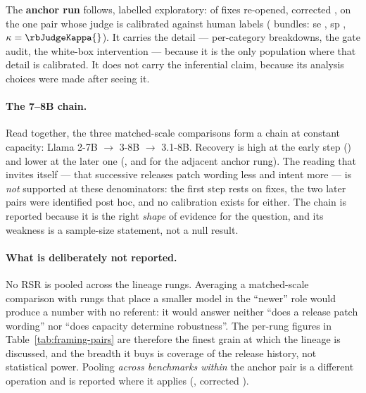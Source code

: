 The \textbf{anchor run} follows, labelled exploratory: \rbAnchorK{} of \rbAnchorPminus{} fixes
re-opened, corrected \rbAnchorRSRcorr{} \rbAnchorRSRcorrCI{}, on the one pair whose judge is
calibrated against human labels (\rbJudgeBundles{} bundles: se \rbJudgeSe{}, sp \rbJudgeSp{},
$\kappa = \rbJudgeKappa{}$). It carries the detail --- per-category breakdowns, the gate audit, the
white-box intervention --- because it is the only population where that detail is calibrated. It
does not carry the inferential claim, because its analysis choices were made after seeing it.

\paragraph{The 7--8B chain.} Read together, the three matched-scale comparisons form a chain at
constant capacity: Llama 2-7B $\rightarrow$ 3-8B $\rightarrow$ 3.1-8B. Recovery is high at the early
step (\rbChainTwoSevenThreeEightKn{}) and lower at the later one
(\rbChainTwoSevenThreeOneEightKn{}, and \rbLinCKn{} for the adjacent anchor rung). The reading that
invites itself --- that successive releases patch wording less and intent more --- is \emph{not}
supported at these denominators: the first step rests on
\rbChainTwoSevenThreeEightKn{} fixes, the two later pairs were identified post hoc, and no
calibration exists for either. The chain is reported because it is the right \emph{shape} of
evidence for the question, and its weakness is a sample-size statement, not a null result.

\paragraph{What is deliberately not reported.} No RSR is pooled across the lineage rungs. Averaging a
matched-scale comparison with rungs that place a smaller model in the ``newer'' role would produce a
number with no referent: it would answer neither ``does a release patch wording'' nor ``does capacity
determine robustness''. The per-rung figures in Table~\ref{tab:framing-pairs} are therefore the
finest grain at which the lineage is discussed, and the breadth it buys is coverage of the release
history, not statistical power. Pooling \emph{across benchmarks within} the anchor pair is a
different operation and is reported where it applies (\rbPooledKn{}, corrected \rbPooledCorr{}
\rbPooledCorrCI{}).

